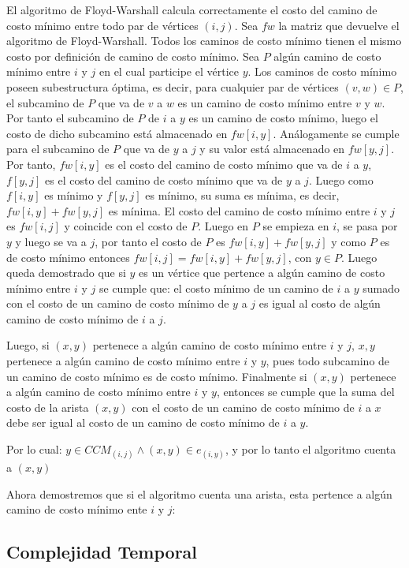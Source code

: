\documentclass[article]{llncs}
\begin{document}
El algoritmo de Floyd-Warshall calcula correctamente el costo del camino de costo m\'inimo entre todo par de v\'ertices $(i,j)$. 
Sea $fw$ la matriz que devuelve el algoritmo de Floyd-Warshall. Todos los caminos de costo m\'inimo tienen el mismo costo por definici\'on 
de camino de costo m\'inimo. Sea $P$ alg\'un camino de costo m\'inimo entre $i$ y $j$ en el cual participe el v\'ertice $y$. Los caminos de costo 
m\'inimo poseen subestructura \'optima, es decir, para cualquier par de v\'ertices $(v,w) \in P$, el subcamino de $P$ que va de $v$ a $w$ es un camino de costo 
m\'inimo entre $v$ y $w$. Por tanto el subcamino de $P$ de $i$ a $y$ es un camino de costo m\'inimo, luego el costo de dicho subcamino est\'a almacenado en $fw[i,y]$. 
An\'alogamente se cumple para el subcamino de $P$ que va de $y$ a $j$ y su valor est\'a almacenado en $fw[y,j]$. Por tanto, $fw[i,y]$ es el costo 
del camino de costo m\'inimo que va de $i$ a $y$, $f[y,j]$ es el costo del camino de costo m\'inimo que va de $y$ a $j$. Luego como $f[i,y]$ es m\'inimo y 
$f[y,j]$ es m\'inimo, su suma es m\'inima, es decir, $fw[i,y] + fw[y,j]$ es m\'inima. El costo del camino de costo m\'inimo entre $i$ y $j$ es $fw[i,j]$  y coincide con el costo de $P$. 
Luego en $P$ se empieza en $i$, se pasa por $y$ y luego se va a $j$, por tanto el costo de $P$ es $fw[i,y] + fw[y,j]$ y como $P$ es de costo m\'inimo entonces 
$fw[i,j] = fw[i,y] + fw[y,j]$, con $y \in P$. Luego queda demostrado que si $y$ es un vértice que pertence a algún camino de costo mínimo entre $i$ y $j$ se cumple que: 
el costo mínimo de un camino de $i$ a $y$ sumado con el costo de un camino de costo mínimo de $y$ a $j$ es igual al costo de algún camino de costo mínimo de $i$ a $j$. 

Luego, si $(x,y)$ pertenece a algún camino de costo mínimo entre $i$ y $j$, $x,y$ pertenece a algún camino de costo mínimo entre $i$ y $y$, pues todo subcamino de un camino de costo mínimo es de costo mínimo.
Finalmente si $(x,y)$ pertenece a algún camino de costo mínimo entre $i$ y $y$, entonces se cumple que la suma del costo de la arista $(x,y)$ con el costo de un camino de costo mínimo de $i$ a $x$ debe ser igual
al costo de un camino de costo mínimo de $i$ a $y$. 

Por lo cual: $ y \in CCM_(i,j) \land (x,y) \in e_(i,y)$, y por lo tanto el algoritmo cuenta a $(x,y)$

Ahora demostremos que si el algoritmo cuenta una arista, esta pertence a algún camino de costo mínimo ente $i$ y $j$:


\subsection{Complejidad Temporal}
\end{document}
